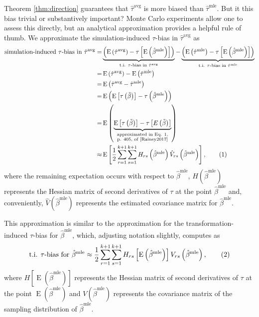\documentclass[11pt]{article}
\newcommand\numberthis{\addtocounter{equation}{1}\tag{\theequation}}
\DeclareMathOperator*{\E}{\text{E}}
\begin{document}
Theorem \ref{thm:direction} guarantees that $\hat{\tau}^\text{avg}$ is more biased than $\hat{\tau}^\text{mle}$. But it this bias trivial or substantively important? Monte Carlo experiments allow one to assess this directly, but an analytical approximation provides a helpful rule of thumb.
We approximate the simulation-induced $\tau$-bias in $\hat{\tau}^\text{avg}$ as
\begin{align*}
\text{simulation-induced $\tau$-bias in } \hat{\tau}^\text{avg} =& \underbrace{\left( \E \left( \hat{\tau}^\text{avg}\right) - \tau \left[\E \left( \hat{\beta}^\text{mle} \right) \right] \right) }_{\text{t.i. } \tau\text{-bias in }\hat{\tau}^{\text{avg}}} - \underbrace{ \left( \E \left( \hat{\tau}^\text{mle}\right) -  \tau \left[\E \left( \hat{\beta}^\text{mle} \right) \right] \right)}_{\text{t.i. } \tau\text{-bias in }\hat{\tau}^{\text{mle}}}\\
=& \E \left( \hat{\tau}^\text{avg}\right) - \E \left( \hat{\tau}^\text{mle}\right)\\
=& \E \left( \hat{\tau}^\text{avg} - \hat{\tau}^\text{mle} \right)\\
=& \E \left(     \E \left[ \tau\left( \tilde{\beta} \right) \right]      -      \tau \left( \hat{\beta}^\text{mle} \right)     \right)\\
=& \E \left(     \underbrace{\E \left[ \tau\left( \tilde{\beta} \right) \right]      -      \tau \left[ E\left(  \tilde{\beta} \right)\right]}_{\substack{\text{approximated in Eq. 1,} \\ \text{p. 405, of \cite{Rainey2017}}}}   \right)\\
\approx & \E \left[ \dfrac{1}{2} \displaystyle \sum_{r = 1}^{k+1} \sum_{s = 1}^{k+1} H_{rs}\left( \hat{\beta}^\text{mle} \right) \hat{V}_{rs} \left( \hat{\beta}^{\text{mle}} \right) \right], \numberthis \label{eqn:avg-approx}
\end{align*}
where the remaining expectation occurs with respect to $\hat{\beta}^\text{mle}$, $H\left( \hat{\beta}^\text{mle} \right)$ represents the Hessian matrix of second derivatives of $\tau$ at the point $\hat{\beta}^\text{mle}$ and, conveniently, $\hat{V} \left( \hat{\beta}^{\text{mle}} \right)$ represents the estimated covariance matrix for $\hat{\beta}^\text{mle}$.

This approximation is similar to the approximation for the transformation-induced $\tau$-bias for $\hat{\beta}^\text{mle}$, which, adjusting notation slightly, \citet[p. 405, Eq. 1]{Rainey2017} computes as
\begin{align*}
\text{t.i. } \tau \text{-bias for } \hat{\beta}^\text{mle} \approx \dfrac{1}{2} \displaystyle \sum_{r = 1}^{k+1} \sum_{s = 1}^{k+1} H_{rs}\left[ \E \left( \hat{\beta}^\text{mle} \right) \right] V_{rs} \left( \hat{\beta}^{\text{mle}} \right), \numberthis \label{eqn:mle-approx}
\end{align*}
where $H\left[ \E \left( \hat{\beta}^\text{mle} \right) \right]$ represents the Hessian matrix of second derivatives of $\tau$ at the point $\E \left( \hat{\beta}^\text{mle} \right)$ and $V \left( \hat{\beta}^{\text{mle}} \right)$ represents the covariance matrix of the sampling distribution of $\hat{\beta}^\text{mle}$.
\end{document}
